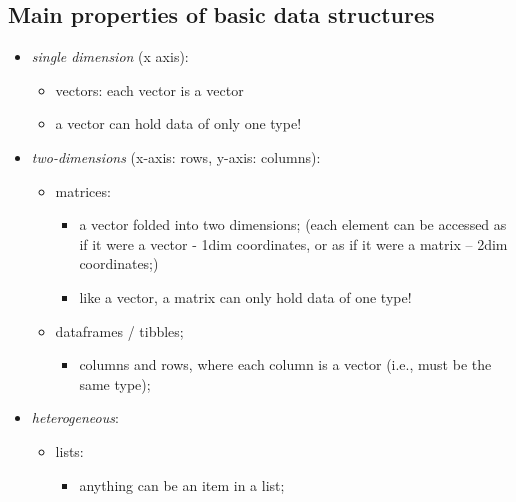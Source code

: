 \documentclass[
]{book}
\providecommand{\tightlist}{%
  \setlength{\itemsep}{0pt}\setlength{\parskip}{0pt}}
\begin{document}
\hypertarget{main-properties-of-basic-data-structures}{%
\subsection{Main properties of basic data structures}\label{main-properties-of-basic-data-structures}}

\begin{itemize}
\tightlist
\item
  \emph{single dimension} (x axis):

  \begin{itemize}
  \tightlist
  \item
    vectors: each vector is a vector
  \item
    a vector can hold data of only one type!
  \end{itemize}
\item
  \emph{two-dimensions} (x-axis: rows, y-axis: columns):

  \begin{itemize}
  \tightlist
  \item
    matrices:

    \begin{itemize}
    \tightlist
    \item
      a vector folded into two dimensions; (each element can be accessed as if it were a vector - 1dim coordinates, or as if it were a matrix -- 2dim coordinates;)
    \item
      like a vector, a matrix can only hold data of one type!
    \end{itemize}
  \item
    dataframes / tibbles;

    \begin{itemize}
    \tightlist
    \item
      columns and rows, where each column is a vector (i.e., must be the same type);
    \end{itemize}
  \end{itemize}
\item
  \emph{heterogeneous}:

  \begin{itemize}
  \tightlist
  \item
    lists:

    \begin{itemize}
    \tightlist
    \item
      anything can be an item in a list;
    \end{itemize}
  \end{itemize}
\end{itemize}
\end{document}
